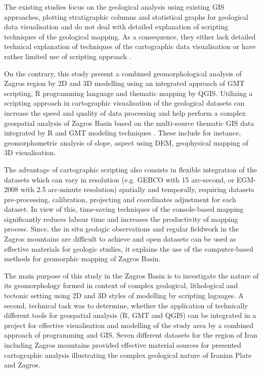 \documentclass[12pt,a4paper,oneside]{article}
\def \newpar{\vspace{6pt}}
\begin{document}
\newpar The existing studies focus on the geological analysis using existing GIS approaches, plotting stratigraphic columns and statistical graphs for geological data visualisation \cite{Mouthereau,Koshnaw,Suetova} and do not deal with detailed explanation of scripting techniques of the geological mapping. As a consequence, they either lack detailed technical explanation of techniques of the cartographic data visualisation \cite{Tavani} or have rather limited use of scripting approach \cite{Lemenkova2020b}. 

\newpar On the contrary, this study present a combined geomorphological analysis of Zagros region by 2D and 3D modelling using an integrated approach of GMT scripting, R programming language and thematic mapping by QGIS. Utilizing a scripting approach in cartographic visualisation of the geological datasets can increase the speed and quality of data processing and help perform a complex geospatial analysis of Zagros Basin based on the multi-source thematic GIS data integrated by R and GMT modeling techniques \cite{Lemenkova2019a}. These include for instance, geomorphometric analysis of slope, aspect using DEM, geophysical mapping of 3D visualisation. 

\newpar The advantage of cartographic scripting also consists in flexible integration of the datasets which can vary in resolution (e.g. GEBCO with 15 arc-second, or EGM-2008 with 2.5 arc-minute resolution) spatially and temporally, requiring datasets pre-processing, calibration, projecting and coordinates adjustment for each dataset. In view of this, time-saving techniques of the console-based mapping significantly reduces labour time and increases the productivity of mapping process.  Since, the in situ geologic observations and regular fieldwork in the Zagros mountains are difficult to achieve and open datasets can be used as effective materials for geologic studies, it explains the use of the computer-based methods for geomorphic mapping of Zagros Basin. 

\newpar The main purpose of this study in the Zagros Basin is to investigate the nature of its geomorphology formed in context of complex geological, lithological and tectonic setting using 2D and 3D styles of modelling by scripting laguages. A second, technical task was to determine, whether the application of technically different tools for geospatial analysis (R, GMT and QGIS) can be integrated in a project for effective visualisation and modelling of the study area by a combined approach of programming and GIS. Seven different datasets for the region of Iran including Zagros mountains provided effective material sources for presented cartographic analysis illustrating the complex geological nature of Iranian Plate and Zagros. 
\end{document}
